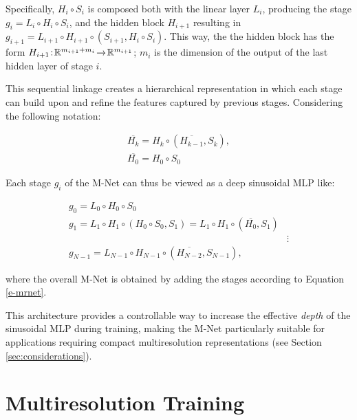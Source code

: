 Specifically, $H_i\circ  S_i$ is composed both with the linear layer $L_i$, producing the stage $g_i\! =\! L_i\!\circ\! H_i\!\circ\!  S_i$, and the hidden block $H_{i+1}$ resulting in $g_{i+1}\! =\! L_{i+1}\!\circ H_{i+1}\!\circ\left(S_{i+1}, H_i\circ  S_i\right)$. This way, the the hidden block has the form $H_{i+1}\!:\!\mathbb{R}^{m_{i+1} + m_i}\!\to\! \mathbb{R}^{m_{i+1}}$; $m_i$ is the dimension of the output of the last hidden layer of stage $i$. 

This sequential linkage creates a hierarchical representation in which each stage can build upon and refine the features captured by previous stages. Considering the following notation:

\begin{align}
    \overline{H_k} = H_k \circ (\overline{H_{k-1}}, S_{k}), \\
    \overline{H_0} = H_0 \circ S_0
\end{align}

Each stage $g_i$ of the M-Net can thus be viewed as a deep sinusoidal MLP like:

\begin{align}
    g_0 = L_0 \circ H_0 \circ S_0 \\
    g_1 = L_1 \circ H_1 \circ (H_0 \circ S_0, S_1) = L_1 \circ H_1 \circ (\overline{H_0}, S_1)\\
    &\vdots\\
    g_{N-1} = L_{N-1} \circ H_{N-1} \circ (\overline{H_{N-2}}, S_{N-1}),
\end{align}

where the overall M-Net is obtained by adding the stages according to Equation \ref{e-mrnet}.


This architecture provides a controllable way to increase the effective \textit{depth} of the sinusoidal MLP during training, making the M-Net particularly suitable for applications requiring compact multiresolution representations (see Section \ref{sec:considerations}).


\section{Multiresolution Training}\label{sec:mr_training}
\label{s:training}


